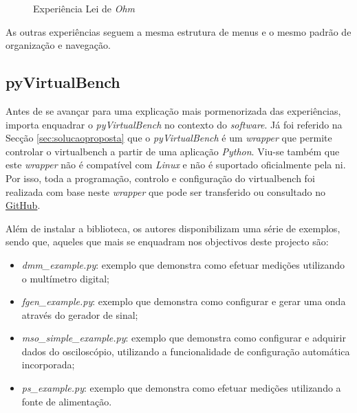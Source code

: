 \begin{figure}[hbtp]
	\centering%
		\centering
		\qquad
		\caption{Experiência Lei de \textit{Ohm}}%
		\label{fig:pagohm}%
	\end{figure}

As outras experiências seguem a mesma estrutura de menus e o mesmo padrão de organização e navegação.

\subsection{pyVirtualBench}
\label{sec:pyvirtualbench}
Antes de se avançar para uma explicação mais pormenorizada das experiências, importa enquadrar o \textit{pyVirtualBench} no contexto do \textit{software}. Já foi referido na Secção \ref{sec:solucaoproposta} que o \textit{pyVirtualBench} é um \textit{wrapper} que permite controlar o \acrshort{virtualbench} a partir de uma aplicação \textit{Python}. Viu-se também que este \textit{wrapper} não é compatível com \textit{Linux} e não é suportado oficialmente pela \acrshort{ni}. Por isso, toda a programação, controlo e configuração do \acrshort{virtualbench} foi realizada com base neste \textit{wrapper} que pode ser transferido ou consultado no \href{https://github.com/armstrap/armstrap-pyvirtualbench/tree/master}{GitHub}.

Além de instalar a biblioteca, os autores disponibilizam uma série de exemplos, sendo que, aqueles que mais se enquadram nos objectivos deste projecto são:
\begin{itemize}
	\item \textit{dmm\_example.py}: exemplo que demonstra como efetuar medições utilizando o multímetro digital;
	\item \textit{fgen\_example.py}: exemplo que demonstra como configurar e gerar uma onda através do gerador de sinal;
	\item \textit{mso\_simple\_example.py}: exemplo que demonstra como configurar e adquirir dados do osciloscópio, utilizando a funcionalidade de configuração automática incorporada;
	\item \textit{ps\_example.py}: exemplo que demonstra como efetuar medições utilizando a fonte de alimentação.
\end{itemize}

